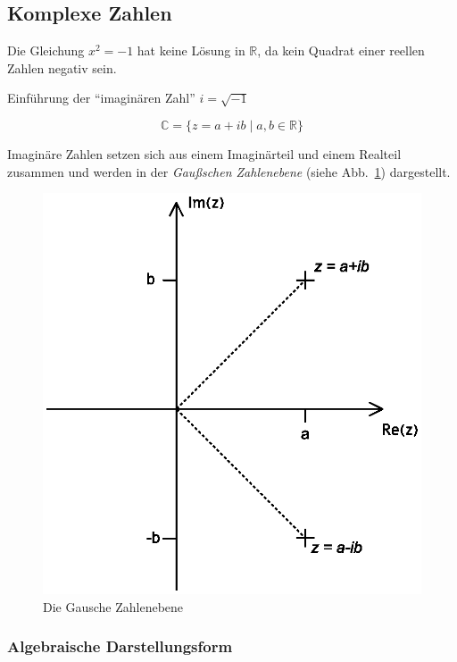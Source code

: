 \subsection{Komplexe Zahlen}

Die Gleichung \(x^2=-1\) hat keine Lösung in \(\mathbb{R}\), da kein Quadrat einer
reellen Zahlen negativ sein.

Einführung der \enquote{imaginären Zahl} \(i = \sqrt{-1}\)

\[
	\mathbb{C} = \{z=a+ib \mid a,b \in \mathbb{R}\}
\]

Imaginäre Zahlen setzen sich aus einem Imaginärteil und einem Realteil zusammen
und werden in der \textit{Gaußschen Zahlenebene} (siehe Abb.~\ref{fig:gausche_zahlenebene}) dargestellt.

\begin{figure}
	\centering
	\includegraphics[scale=0.5]{grafiken/Komplexe_Zahlen}
	\caption{Die Gausche Zahlenebene}\label{fig:gausche_zahlenebene}
\end{figure}

\subsubsection{Algebraische Darstellungsform}


